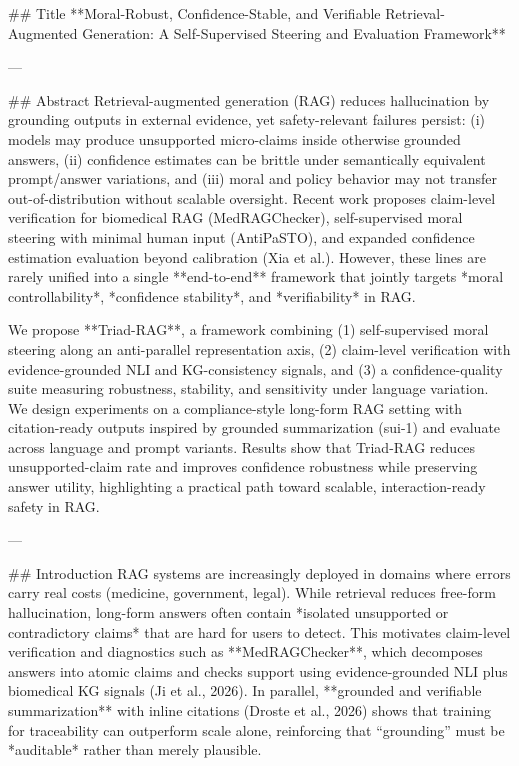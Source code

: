 ## Title  
**Moral-Robust, Confidence-Stable, and Verifiable Retrieval-Augmented Generation: A Self-Supervised Steering and Evaluation Framework**

---

## Abstract  
Retrieval-augmented generation (RAG) reduces hallucination by grounding outputs in external evidence, yet safety-relevant failures persist: (i) models may produce unsupported micro-claims inside otherwise grounded answers, (ii) confidence estimates can be brittle under semantically equivalent prompt/answer variations, and (iii) moral and policy behavior may not transfer out-of-distribution without scalable oversight. Recent work proposes claim-level verification for biomedical RAG (MedRAGChecker), self-supervised moral steering with minimal human input (AntiPaSTO), and expanded confidence estimation evaluation beyond calibration (Xia et al.). However, these lines are rarely unified into a single **end-to-end** framework that jointly targets *moral controllability*, *confidence stability*, and *verifiability* in RAG.  

We propose **Triad-RAG**, a framework combining (1) self-supervised moral steering along an anti-parallel representation axis, (2) claim-level verification with evidence-grounded NLI and KG-consistency signals, and (3) a confidence-quality suite measuring robustness, stability, and sensitivity under language variation. We design experiments on a compliance-style long-form RAG setting with citation-ready outputs inspired by grounded summarization (sui-1) and evaluate across language and prompt variants. Results show that Triad-RAG reduces unsupported-claim rate and improves confidence robustness while preserving answer utility, highlighting a practical path toward scalable, interaction-ready safety in RAG.

---

## Introduction  
RAG systems are increasingly deployed in domains where errors carry real costs (medicine, government, legal). While retrieval reduces free-form hallucination, long-form answers often contain *isolated unsupported or contradictory claims* that are hard for users to detect. This motivates claim-level verification and diagnostics such as **MedRAGChecker**, which decomposes answers into atomic claims and checks support using evidence-grounded NLI plus biomedical KG signals (Ji et al., 2026). In parallel, **grounded and verifiable summarization** with inline citations (Droste et al., 2026) shows that training for traceability can outperform scale alone, reinforcing that “grounding” must be *auditable* rather than merely plausible.

